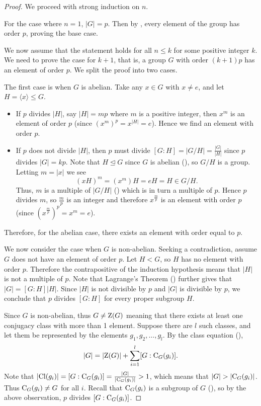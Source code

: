 \begin{proof}
    We proceed with strong induction on $n$.

    For the case where $n = 1$, $|G| = p$. Then by , every element of the group has order $p$, proving the base case.

    We now assume that the statement holds for all $n \leq k$ for some positive integer $k$. We need to prove the case for $k+1$, that is, a group $G$ with order $(k+1)p$ has an element of order $p$. We split the proof into two cases.

    The first case is when $G$ is abelian. Take any $x \in G$ with $x \neq e$, and let $H = \langle x \rangle \leq G$.
    \begin{itemize}
        \item If $p$ divides $|H|$, say $|H| = mp$ where $m$ is a positive integer, then $x^m$ is an element of order $p$ (since $\left(x^m\right)^p = x^{|H|} = e$). Hence we find an element with order $p$.
        \item If $p$ does not divide $|H|$, then $p$ must divide $[G:H] = |G/H| = \frac{|G|}{|H|}$ since $p$ divides $|G| = kp$. Note that $H \unlhd G$ since $G$ is abelian (), so $G/H$ is a group. Letting $m = |x|$ we see
        \[
            (xH)^m = (x^m)H = eH = H \in G/H.
        \]
        Thus, $m$ is a multiple of $|G/H|$ () which is in turn a multiple of $p$. Hence $p$ divides $m$, so $\frac mp$ is an integer and therefore $x^{\frac mp}$ is an element with order $p$ (since $\left(x^{\frac mp}\right)^p = x^m = e$).
    \end{itemize}
    Therefore, for the abelian case, there exists an element with order equal to $p$.

    We now consider the case when $G$ is non-abelian. Seeking a contradiction, assume $G$ does not have an element of order $p$. Let $H < G$, so $H$ has no element with order $p$. Therefore the contrapositive of the induction hypothesis means that $|H|$ is not a multiple of $p$. Note that Lagrange's Theorem () further gives that $|G| = [G:H]|H|$. Since $|H|$ is not divisible by $p$ and $|G|$ is divisible by $p$, we conclude that $p$ divides $[G:H]$ for every proper subgroup $H$.

    Since $G$ is non-abelian, thus $G \neq \mathrm{Z}(G)$ meaning that there exists at least one conjugacy class with more than 1 element. Suppose there are $l$ such classes, and let them be represented by the elements $g_1, g_2, \dots, g_l$. By the class equation (),
    \[
        |G| = |\mathrm{Z}(G)| + \sum_{i=1}^l [G:\mathrm{C}_{G}(g_i)].
    \]
    Note that $|\mathrm{Cl}(g_i)| = [G:\mathrm{C}_{G}(g_i)] = \frac{|G|}{|\mathrm{C}_{G}(g_i)|} > 1$, which means that $|G| > |\mathrm{C}_{G}(g_i)|$. Thus $\mathrm{C}_{G}(g_i) \neq G$ for all $i$. Recall that $\mathrm{C}_{G}(g_i)$ is a subgroup of $G$ (), so by the above observation, $p$ divides $[G:\mathrm{C}_{G}(g_i)]$.


\end{proof}
